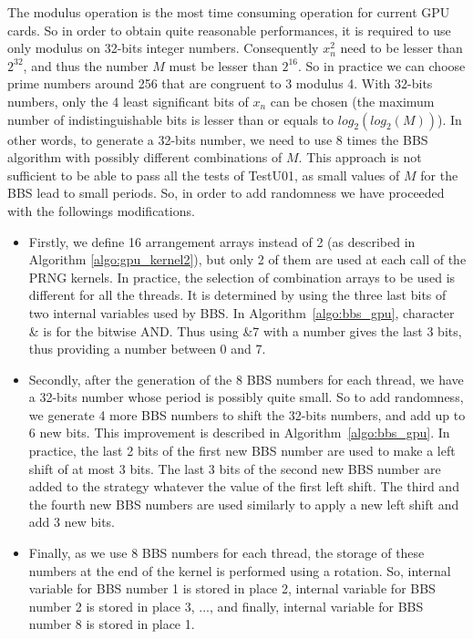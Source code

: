 \documentclass{article}
\begin{document}
  
The modulus operation is the most time consuming operation for current
GPU cards.  So in order to obtain quite reasonable performances, it is
required to use only modulus  on 32-bits integer numbers. Consequently
$x_n^2$ need  to be lesser than $2^{32}$,  and thus the number $M$ must be
lesser than $2^{16}$.  So in practice we can choose prime numbers around
256 that are congruent to 3 modulus 4.  With 32-bits numbers, only the
4 least significant bits of $x_n$ can be chosen (the maximum number of
indistinguishable    bits    is    lesser    than   or    equals    to
$log_2(log_2(M))$). In other words, to generate a  32-bits number, we need to use
8 times  the BBS  algorithm with possibly different  combinations of  $M$. This
approach is  not sufficient to be able to pass  all the tests of TestU01,
as small values of  $M$ for the BBS  lead to
  small periods. So, in  order to add randomness  we have proceeded with
the followings  modifications. 
\begin{itemize}
\item
Firstly, we  define 16 arrangement arrays  instead of 2  (as described in
Algorithm \ref{algo:gpu_kernel2}), but only 2 of them are used at each call of
the  PRNG kernels. In  practice, the  selection of   combination
arrays to be used is different for all the threads. It is determined
by using  the three last bits  of two internal variables  used by BBS.
In Algorithm~\ref{algo:bbs_gpu},
character  \& is for the  bitwise AND. Thus using  \&7 with  a number
gives the last 3 bits, thus providing a number between 0 and 7.
\item
Secondly, after the  generation of the 8 BBS numbers  for each thread, we
have a 32-bits number whose period is possibly quite small. So
to add randomness,  we generate 4 more BBS numbers   to
shift  the 32-bits  numbers, and  add up to  6 new  bits.  This  improvement is
described  in Algorithm~\ref{algo:bbs_gpu}.  In  practice, the last 2 bits
of the first new BBS number are  used to make a left shift of at most
3 bits. The  last 3 bits of the  second new BBS number are  added to the
strategy whatever the value of the first left shift. The third and the
fourth new BBS  numbers are used similarly to apply  a new left shift
and add 3 new bits.
\item
Finally, as  we use 8 BBS numbers  for each thread, the  storage of these
numbers at the end of the  kernel is performed using a rotation. So,
internal  variable for  BBS number  1 is  stored in  place  2, internal
variable  for BBS  number 2  is  stored in  place 3,  ..., and finally, internal
variable for BBS number 8 is stored in place 1.
\end{itemize}
\end{document}
